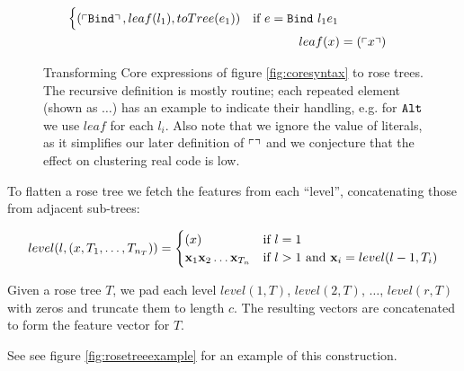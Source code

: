 \begin{figure}
\begin{align*}
\begin{cases}
      (\left\ulcorner \texttt{Bind} \right\urcorner, leaf(l_1), toTree(e_1))                    & \text{if $e = \texttt{Bind}\ l_1 e_1$}
    \end{cases} \\
    leaf(x) &= (\left\ulcorner x \right\urcorner)
  \end{align*}
  \caption{Transforming Core expressions of figure \ref{fig:coresyntax} to rose trees. The recursive definition is mostly routine; each repeated element (shown as $\dots$) has an example to indicate their handling, e.g. for $\texttt{Alt}$ we use $leaf$ for each $l_i$. Also note that we ignore the value of literals, as it simplifies our later definition of $\left\ulcorner  \right\urcorner$ and we conjecture that the effect on clustering real code is low.}
  \label{fig:totree}
\end{figure}

To flatten a rose tree we fetch the features from each ``level'', concatenating those from adjacent sub-trees:

\begin{equation*}
  level(l, (x, T_1, \dots, T_{n_T})) =
    \begin{cases}
      (x) & \text{if $l = 1$} \\
      \mathbf{x}_1 \mathbf{x}_2 \dots \mathbf{x}_{T_n} & \text{if $l > 1$ and $\mathbf{x}_i = level(l - 1, T_i)$}
    \end{cases}
\end{equation*}

Given a rose tree $T$, we pad each level $level(1, T)$, $level(2, T)$, $\dots$, $level(r, T)$ with zeros and truncate them to length $c$. The resulting vectors are concatenated to form the feature vector for $T$.

See see figure \ref{fig:rosetreeexample} for an example of this construction.

